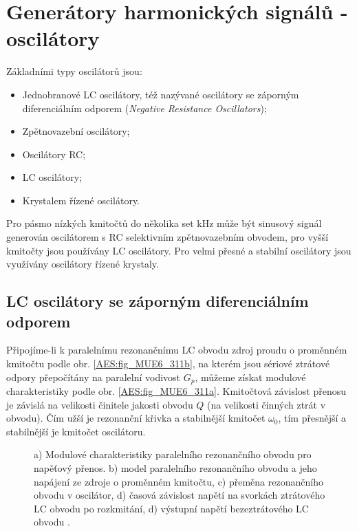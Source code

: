   \section{Generátory harmonických signálů - oscilátory}
    Základními typy oscilátorů jsou:
    \begin{itemize}[noitemsep]
      \item Jednobranové LC oscilátory, též nazývané oscilátory se záporným diferenciálním odporem 
            (\emph{Negative Resistance Oscillators});
      \item Zpětnovazební oscilátory;
      \item Oscilátory RC;
      \item LC oscilátory;
      \item Krystalem řízené oscilátory.
    \end{itemize}

    Pro pásmo nízkých kmitočtů do několika set kHz může být sinusový signál generován oscilátorem s 
    RC selektivním zpětnovazebním obvodem, pro vyšší kmitočty jsou používány LC oscilátory. Pro 
    velmi přesné a stabilní oscilátory jsou využívány oscilátory řízené krystaly.
    
    \subsection{LC oscilátory se záporným diferenciálním odporem}
      Připojíme-li k paralelnímu rezonančnímu LC obvodu zdroj proudu o proměnném kmitočtu podle 
      obr. \ref{AES:fig_MUE6_311b}, na kterém jsou sériové ztrátové odpory přepočítány na paralelní 
      vodivost \(G_p\), můžeme získat modulové charakteristiky podle obr. \ref{AES:fig_MUE6_311a}. 
      Kmitočtová závislost přenosu je závislá na velikosti činitele jakosti obvodu \(Q\) (na 
      velikosti činných ztrát v obvodu). Čím užší je rezonanční křivka a stabilnější kmitočet 
      \(\omega_0\), tím přesnější a stabilnější je kmitočet oscilátoru.

      \begin{figure}[ht!]
        \centering     
          \newline
          \newline
        \caption{a) Modulové charakteristiky paralelního rezonančního obvodu pro napěťový přenos.
                 b) model paralelního rezonančního obvodu a jeho napájení ze zdroje o proměnném 
                 kmitočtu, c) přeměna rezonančního obvodu v oscilátor, d) časová závislost napětí 
                 na svorkách ztrátového LC obvodu po rozkmitání, d) výstupní napětí bezeztrátového 
                 LC obvodu 
                 \cite[s.~135]{Dolecek2009}.}
        \label{AES:fig_MUE6_311}
      \end{figure}
      
